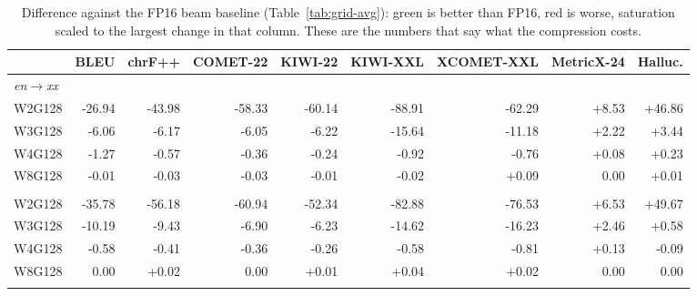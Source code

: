 \begin{table}[t]
\centering
\footnotesize
\setlength{\tabcolsep}{4pt}
\begin{tabular}{lrrrrrrrr}
\toprule
& BLEU & chrF++ & COMET-22 & KIWI-22 & KIWI-XXL & XCOMET-XXL & MetricX-24 & Halluc. \\
\midrule
\multicolumn{9}{l}{\emph{en$\rightarrow$xx}} \\
W2G128 & \cellcolor{red!60}-26.94 & \cellcolor{red!60}-43.98 & \cellcolor{red!60}-58.33 & \cellcolor{red!60}-60.14 & \cellcolor{red!60}-88.91 & \cellcolor{red!60}-62.29 & \cellcolor{red!60}+8.53 & \cellcolor{red!60}+46.86 \\
W3G128 & \cellcolor{red!14}-6.06 & \cellcolor{red!8}-6.17 & \cellcolor{red!6}-6.05 & \cellcolor{red!6}-6.22 & \cellcolor{red!11}-15.64 & \cellcolor{red!11}-11.18 & \cellcolor{red!16}+2.22 & \cellcolor{red!4}+3.44 \\
W4G128 & \cellcolor{red!3}-1.27 & \cellcolor{red!1}-0.57 & -0.36 & -0.24 & \cellcolor{red!1}-0.92 & \cellcolor{red!1}-0.76 & \cellcolor{red!1}+0.08 & +0.23 \\
W8G128 & -0.01 & -0.03 & -0.03 & -0.01 & -0.02 & +0.09 & 0.00 & +0.01 \\
\addlinespace
\multicolumn{9}{l}{\emph{xx$\rightarrow$en}} \\
W2G128 & \cellcolor{red!60}-35.78 & \cellcolor{red!60}-56.18 & \cellcolor{red!60}-60.94 & \cellcolor{red!60}-52.34 & \cellcolor{red!60}-82.88 & \cellcolor{red!60}-76.53 & \cellcolor{red!60}+6.53 & \cellcolor{red!60}+49.67 \\
W3G128 & \cellcolor{red!17}-10.19 & \cellcolor{red!10}-9.43 & \cellcolor{red!7}-6.90 & \cellcolor{red!7}-6.23 & \cellcolor{red!11}-14.62 & \cellcolor{red!13}-16.23 & \cellcolor{red!23}+2.46 & \cellcolor{red!1}+0.58 \\
W4G128 & \cellcolor{red!1}-0.58 & -0.41 & -0.36 & -0.26 & -0.58 & \cellcolor{red!1}-0.81 & \cellcolor{red!1}+0.13 & -0.09 \\
W8G128 & 0.00 & +0.02 & 0.00 & +0.01 & +0.04 & +0.02 & 0.00 & 0.00 \\
\addlinespace
\bottomrule
\end{tabular}
\caption{Difference against the FP16 beam baseline (Table~\ref{tab:grid-avg}): green is better than FP16, red is worse, saturation scaled to the largest change in that column. These are the numbers that say what the compression costs.}
\label{tab:grid-delta}
\end{table}

